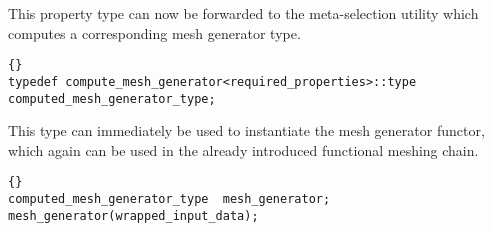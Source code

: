 This property type can now be forwarded to the meta-selection utility which 
computes a corresponding mesh generator type.
\begin{lstlisting}{}
typedef compute_mesh_generator<required_properties>::type   computed_mesh_generator_type;
\end{lstlisting}

This type can immediately be used to instantiate the mesh generator functor, 
which again can be used in the already introduced functional meshing chain.
\begin{lstlisting}{}
computed_mesh_generator_type  mesh_generator;
mesh_generator(wrapped_input_data);
\end{lstlisting}


